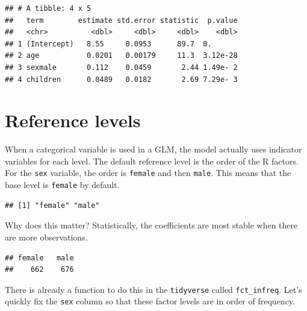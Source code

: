 \documentclass[]{book}
\newenvironment{Shaded}{\begin{snugshade}}{\end{snugshade}}
\newcommand{\KeywordTok}[1]{\textcolor[rgb]{0.13,0.29,0.53}{\textbf{#1}}}
\newcommand{\NormalTok}[1]{#1}
\newcommand{\OperatorTok}[1]{\textcolor[rgb]{0.81,0.36,0.00}{\textbf{#1}}}
\newcommand{\StringTok}[1]{\textcolor[rgb]{0.31,0.60,0.02}{#1}}
\begin{document}
\begin{verbatim}
## # A tibble: 4 x 5
##   term        estimate std.error statistic  p.value
##   <chr>          <dbl>     <dbl>     <dbl>    <dbl>
## 1 (Intercept)   8.55     0.0953      89.7  0.      
## 2 age           0.0201   0.00179     11.3  3.12e-28
## 3 sexmale       0.112    0.0459       2.44 1.49e- 2
## 4 children      0.0489   0.0182       2.69 7.29e- 3
\end{verbatim}

\hypertarget{reference-levels}{%
\section{Reference levels}\label{reference-levels}}

When a categorical variable is used in a GLM, the model actually uses indicator variables for each level. The default reference level is the order of the R factors. For the \texttt{sex} variable, the order is \texttt{female} and then \texttt{male}. This means that the base level is \texttt{female} by default.

\begin{Shaded}
\end{Shaded}

\begin{verbatim}
## [1] "female" "male"
\end{verbatim}

Why does this matter? Statistically, the coefficients are most stable when there are more observations.

\begin{Shaded}
\end{Shaded}

\begin{verbatim}
## female   male 
##    662    676
\end{verbatim}

There is already a function to do this in the \texttt{tidyverse} called \texttt{fct\_infreq}. Let's quickly fix the \texttt{sex} column so that these factor levels are in order of frequency.
\end{document}
